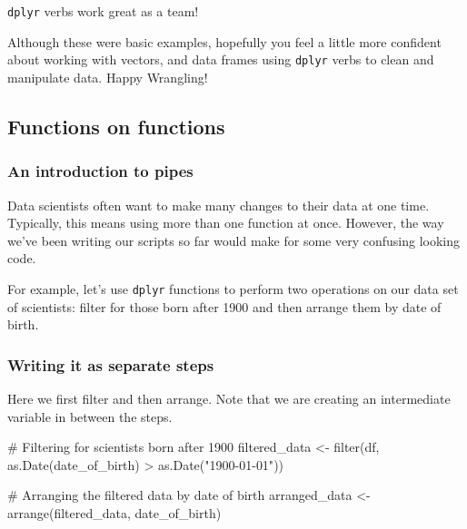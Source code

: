 \documentclass[
  letterpaper,
  DIV=11,
  numbers=noendperiod]{scrreprt}
\newenvironment{Shaded}{\begin{snugshade}}{\end{snugshade}}
\newcommand{\CommentTok}[1]{\textcolor[rgb]{0.37,0.37,0.37}{#1}}
\newcommand{\FunctionTok}[1]{\textcolor[rgb]{0.28,0.35,0.67}{#1}}
\newcommand{\NormalTok}[1]{\textcolor[rgb]{0.00,0.23,0.31}{#1}}
\newcommand{\OtherTok}[1]{\textcolor[rgb]{0.00,0.23,0.31}{#1}}
\newcommand{\SpecialCharTok}[1]{\textcolor[rgb]{0.37,0.37,0.37}{#1}}
\newcommand{\StringTok}[1]{\textcolor[rgb]{0.13,0.47,0.30}{#1}}
\begin{document}
\begin{tcolorbox}[enhanced jigsaw, left=2mm, colframe=quarto-callout-tip-color-frame, leftrule=.75mm, opacitybacktitle=0.6, toptitle=1mm, title=\textcolor{quarto-callout-tip-color}{\faLightbulb}\hspace{0.5em}{Tip}, opacityback=0, coltitle=black, colbacktitle=quarto-callout-tip-color!10!white, breakable, colback=white, titlerule=0mm, bottomrule=.15mm, arc=.35mm, bottomtitle=1mm, rightrule=.15mm, toprule=.15mm]

\texttt{dplyr} verbs work great as a team!

\end{tcolorbox}

Although these were basic examples, hopefully you feel a little more
confident about working with vectors, and data frames using
\texttt{dplyr} verbs to clean and manipulate data. Happy Wrangling!

\hypertarget{functions-on-functions}{%
\subsection{Functions on functions}\label{functions-on-functions}}

\hypertarget{an-introduction-to-pipes}{%
\subsubsection{An introduction to
pipes}\label{an-introduction-to-pipes}}

Data scientists often want to make many changes to their data at one
time. Typically, this means using more than one function at once.
However, the way we've been writing our scripts so far would make for
some very confusing looking code.

For example, let's use \texttt{dplyr} functions to perform two
operations on our data set of scientists: filter for those born after
1900 and then arrange them by date of birth.

\hypertarget{writing-it-as-separate-steps}{%
\subsubsection{Writing it as separate
steps}\label{writing-it-as-separate-steps}}

Here we first filter and then arrange. Note that we are creating an
intermediate variable in between the steps.

\begin{Shaded}
\begin{Highlighting}[]
\CommentTok{\# Filtering for scientists born after 1900}
\NormalTok{filtered\_data }\OtherTok{\textless{}{-}} \FunctionTok{filter}\NormalTok{(df, }\FunctionTok{as.Date}\NormalTok{(date\_of\_birth) }\SpecialCharTok{\textgreater{}} \FunctionTok{as.Date}\NormalTok{(}\StringTok{"1900{-}01{-}01"}\NormalTok{))}

\CommentTok{\# Arranging the filtered data by date of birth}
\NormalTok{arranged\_data }\OtherTok{\textless{}{-}} \FunctionTok{arrange}\NormalTok{(filtered\_data, date\_of\_birth)}
\end{Highlighting}
\end{Shaded}
\end{document}
